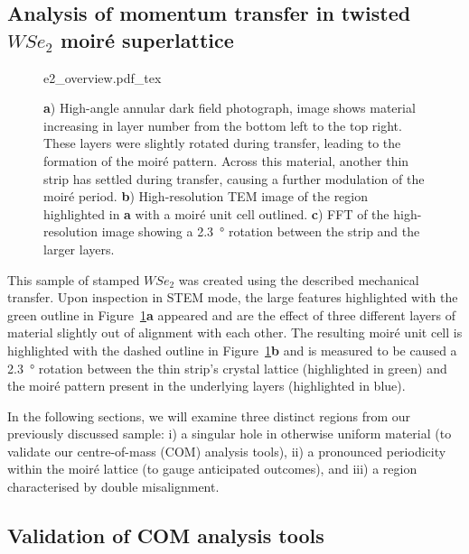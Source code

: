 \subsection{Analysis of momentum transfer in twisted $WSe_2$ moiré superlattice}

\begin{figure}
    \centering
    \def\svgwidth{.95\linewidth}
    {e2_overview.pdf_tex}
    \caption{\textbf{a}) High-angle annular dark field photograph, image shows material increasing in layer number from the bottom left to the top right. These layers were slightly rotated during transfer, leading to the formation of the moiré pattern. Across this material, another thin strip has settled during transfer, causing a further modulation of the moiré period. \textbf{b}) High-resolution TEM image of the region highlighted in \textbf{a} with a moiré unit cell outlined. \textbf{c}) FFT of the high-resolution image showing a \SI{2.3}{\degree} rotation between the strip and the larger layers.}
    \label{fig:dub_moire}
\end{figure}

This sample of stamped $WSe_2$ was created using the described mechanical transfer. Upon inspection in STEM mode, the large features highlighted with the green outline in Figure~\ref{fig:dub_moire}\textbf{a} appeared and are the effect of three different layers of material slightly out of alignment with each other. 
%
The resulting moiré unit cell is highlighted with the dashed outline in Figure~\ref{fig:dub_moire}\textbf{b} and is measured to be caused a \SI{2.3}{\degree} rotation between the thin strip's crystal lattice (highlighted in green) and the moiré pattern present in the underlying layers (highlighted in blue).


In the following sections, we will examine three distinct regions from our previously discussed sample: i) a singular hole in otherwise uniform material (to validate our centre-of-mass (COM) analysis tools), ii) a pronounced periodicity within the moiré lattice (to gauge anticipated outcomes), and  iii) a region characterised by double misalignment.

\subsection{Validation of COM analysis tools}

